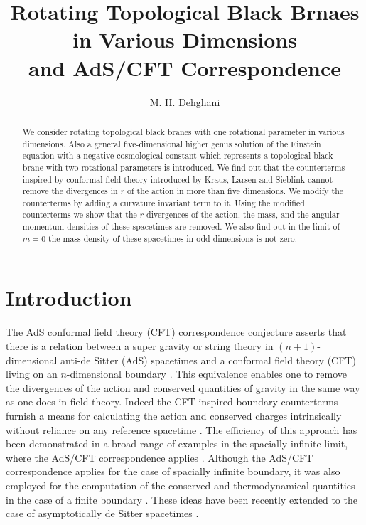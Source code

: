 \documentclass[a4paper,12pt,onecolumn]{revtex4}
\begin{document}
\title{Rotating Topological Black Brnaes in Various Dimensions\\
and AdS/CFT Correspondence}
\author{M. H. Dehghani}
\address{Physics Department and Biruni  Observatory,
         Shiraz University, Shiraz 71454, Iran}
\begin{abstract}
We consider rotating topological black branes with one rotational
parameter in various dimensions. Also a general five-dimensional
higher genus solution of the Einstein equation with a negative
cosmological constant which represents a topological black brane
with two rotational parameters is introduced. We find out that the
counterterms inspired by conformal field theory introduced by
Kraus, Larsen and Sieblink cannot remove the divergences in $r$ of
the action in more than five dimensions. We modify the
counterterms by adding a curvature invariant term to it. Using the
modified counterterms we show that the $r$ divergences of the
action, the mass, and the angular momentum densities of these
spacetimes are removed. We also find out in the limit of $m=0$ the
mass density of these spacetimes in odd dimensions is not zero.
\end{abstract}

\maketitle



\section{Introduction\label{Intro}}

The AdS conformal field theory (CFT) correspondence conjecture
asserts that there is a relation between a super gravity or string
theory in $(n+1)$-dimensional anti-de Sitter (AdS) spacetimes and
a conformal field theory (CFT) living on an $n$-dimensional
boundary \cite{Mal1}. This equivalence enables one to remove the
divergences of the action and conserved quantities of gravity in
the same way as one does in field theory. Indeed the CFT-inspired
boundary counterterms furnish a means for calculating the action
and conserved charges intrinsically without reliance on any
reference spacetime \cite{Kls,BK1,Hen}. The efficiency of this
approach has been demonstrated in a broad range of examples in the
spacially infinite limit, where the AdS/CFT correspondence applies
\cite{Emp,Mann,Awad}. Although the AdS/CFT correspondence applies
for the case of spacially infinite boundary, it was also employed
for the computation of the conserved and thermodynamical
quantities in the case of a finite boundary \cite{Deh1}. These
ideas have been recently extended to the case of asymptotically de
Sitter spacetimes \cite{Stro1,Deh2}.
\end{document}
